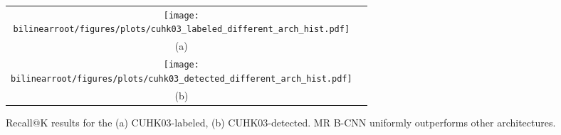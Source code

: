 

 

\begin{figure*}
\begin{center}
    

\begin{tabular}{cc}
\texttt{[image: \\bilinearroot/figures/plots/cuhk03\_labeled\_different\_arch\_hist.pdf]}\\
(a) \\
\texttt{[image: \\bilinearroot/figures/plots/cuhk03\_detected\_different\_arch\_hist.pdf]}\\
(b) 

\end{tabular}
\caption{Recall@K results for the (a) CUHK03-labeled, (b) CUHK03-detected. MR B-CNN uniformly outperforms other architectures.}
\label{fig:recall}
\end{center}
\end{figure*}


